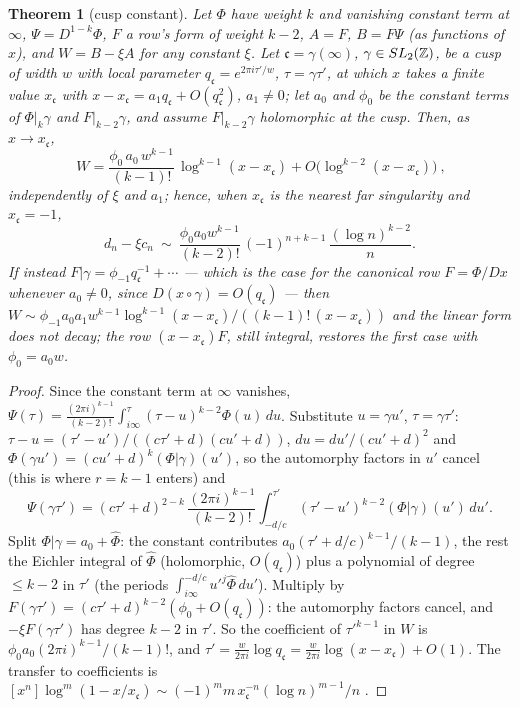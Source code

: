 \documentclass[11pt]{amsart}
\newtheorem{theorem}{Theorem}[section]
\theoremstyle{definition}
\theoremstyle{remark}
\begin{document}
\begin{theorem}[cusp constant]\label{thm:cusp}
Let $\Phi$ have weight $k$ and vanishing constant term at $\infty$, $\Psi=D^{1-k}\Phi$, $F$ a row's form of weight $k-2$, $A=F$, $B=F\Psi$ (as functions of $x$), and $W=B-\xi A$ for any constant $\xi$. Let $\mathfrak c=\gamma(\infty)$, $\gamma\in SL_2(\mathbb Z)$, be a cusp of width $w$ with local parameter $q_{\mathfrak c}=e^{2\pi i\tau'/w}$, $\tau=\gamma\tau'$, at which $x$ takes a finite value $x_{\mathfrak c}$ with $x-x_{\mathfrak c}=a_1q_{\mathfrak c}+O(q_{\mathfrak c}^2)$, $a_1\ne0$; let $a_0$ and $\phi_0$ be the constant terms of $\Phi|_k\gamma$ and $F|_{k-2}\gamma$, and assume $F|_{k-2}\gamma$ holomorphic at the cusp. Then, as $x\to x_{\mathfrak c}$,
$$\boxed{\ W=\frac{\phi_0\,a_0\,w^{k-1}}{(k-1)!}\,\log^{k-1}(x-x_{\mathfrak c})+O\bigl(\log^{k-2}(x-x_{\mathfrak c})\bigr)\ },$$
independently of $\xi$ and $a_1$; hence, when $x_{\mathfrak c}$ is the nearest far singularity and $x_{\mathfrak c}=-1$,
$$d_n-\xi c_n\ \sim\ \frac{\phi_0a_0w^{k-1}}{(k-2)!}\,(-1)^{n+k-1}\,\frac{(\log n)^{k-2}}n .$$
If instead $F|\gamma=\phi_{-1}q_{\mathfrak c}^{-1}+\cdots$ — which is the case for the canonical row $F=\Phi/Dx$ whenever $a_0\ne0$, since $D(x\circ\gamma)=O(q_{\mathfrak c})$ — then $W\sim\phi_{-1}a_0a_1w^{k-1}\log^{k-1}(x-x_{\mathfrak c})/((k-1)!\,(x-x_{\mathfrak c}))$ and the linear form does not decay; the row $(x-x_{\mathfrak c})F$, still integral, restores the first case with $\phi_0=a_0w$.
\end{theorem}
\begin{proof}
Since the constant term at $\infty$ vanishes, $\Psi(\tau)=\frac{(2\pi i)^{k-1}}{(k-2)!}\int_{i\infty}^\tau(\tau-u)^{k-2}\Phi(u)\,du$. Substitute $u=\gamma u'$, $\tau=\gamma\tau'$: $\tau-u=(\tau'-u')/((c\tau'+d)(cu'+d))$, $du=du'/(cu'+d)^2$ and $\Phi(\gamma u')=(cu'+d)^k(\Phi|\gamma)(u')$, so the automorphy factors in $u'$ cancel (this is where $r=k-1$ enters) and
$$\Psi(\gamma\tau')=(c\tau'+d)^{2-k}\,\frac{(2\pi i)^{k-1}}{(k-2)!}\int_{-d/c}^{\tau'}(\tau'-u')^{k-2}(\Phi|\gamma)(u')\,du' .$$
Split $\Phi|\gamma=a_0+\widehat\Phi$: the constant contributes $a_0(\tau'+d/c)^{k-1}/(k-1)$, the rest the Eichler integral of $\widehat\Phi$ (holomorphic, $O(q_{\mathfrak c})$) plus a polynomial of degree $\le k-2$ in $\tau'$ (the periods $\int_{i\infty}^{-d/c}u'^j\widehat\Phi\,du'$). Multiply by $F(\gamma\tau')=(c\tau'+d)^{k-2}(\phi_0+O(q_{\mathfrak c}))$: the automorphy factors cancel, and $-\xi F(\gamma\tau')$ has degree $k-2$ in $\tau'$. So the coefficient of $\tau'^{k-1}$ in $W$ is $\phi_0a_0(2\pi i)^{k-1}/(k-1)!$, and $\tau'=\frac w{2\pi i}\log q_{\mathfrak c}=\frac w{2\pi i}\log(x-x_{\mathfrak c})+O(1)$. The transfer to coefficients is $[x^n]\log^m(1-x/x_{\mathfrak c})\sim(-1)^mm\,x_{\mathfrak c}^{-n}(\log n)^{m-1}/n$ \cite{FS}.
\end{proof}
\end{document}
